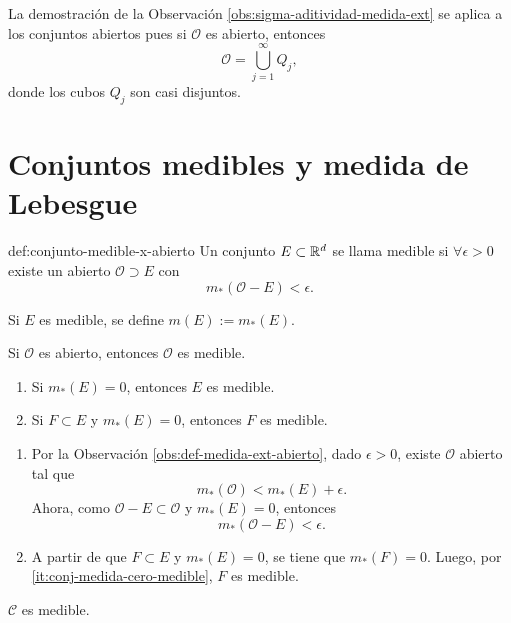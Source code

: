 La demostraci\'on de la Observaci\'on \ref{obs:sigma-aditividad-medida-ext} se aplica a los conjuntos abiertos pues si
$\mathcal{O}$ es abierto, entonces
\[
\mathcal{O}=\bigcup\limits_{j=1}^{\infty} Q_j,
\]
donde los cubos $Q_j$ son casi disjuntos.


\section{Conjuntos medibles y medida de Lebesgue}

\begin{definicion}{def:conjunto-medible-x-abierto}
Un conjunto $E\subset \mathbb{R}^d$ se llama medible si $\forall \epsilon>0$ existe un abierto $\mathcal{O}\supset E$
con 
\[
m_{*}(\mathcal{O}-E)<\epsilon.
\]
\end{definicion}

Si $E$ es medible, se define $m(E):=m_{*}(E)$.

\begin{proposicion}{}
Si $\mathcal{O}$ es abierto, entonces $\mathcal{O}$ es medible.
\end{proposicion}

\begin{proposicion}{}
\begin{enumerate}
    \item\label{it:conj-medida-cero-medible} Si $m_{*}(E)=0$, entonces $E$ es medible. 
    \item Si $F\subset E$ y $m_{*}(E)=0$, entonces $F$ es medible.
\end{enumerate}
\end{proposicion}

\begin{demo}
\begin{enumerate}
    \item Por la Observaci\'on \ref{obs:def-medida-ext-abierto}, 
    dado $\epsilon>0$, existe $\mathcal{O}$ abierto tal que 
    \[
    m_{*}(\mathcal{O})<m_{*}(E)+\epsilon.
    \]
    Ahora, como $\mathcal{O}-E \subset \mathcal{O}$ y $m_{*}(E)=0$, entonces 
    \[
    m_{*}(\mathcal{O}-E)<\epsilon.
    \]

\item  A partir de que $F\subset E$ y $m_{*}(E)=0$, se tiene que $m_{*}(F)=0$. 
Luego, por \ref{it:conj-medida-cero-medible}, $F$ es medible.
\end{enumerate}
\end{demo}

\begin{observacion}{}
$\mathscr{C}$ es medible.
\end{observacion}

